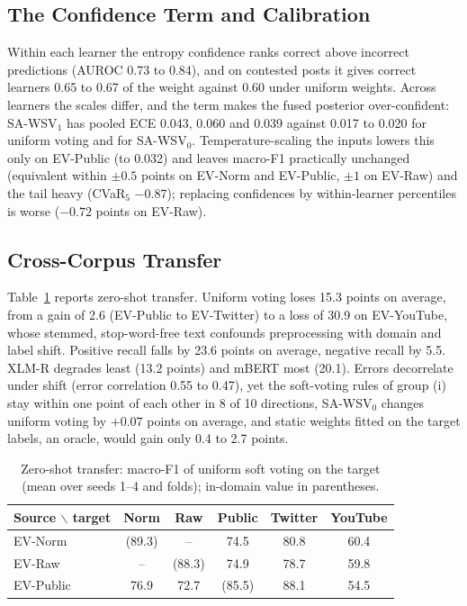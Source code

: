 \documentclass[conference,a4paper]{IEEEtran}
\newcommand{\rcz}{SA\mbox{-}WSV$_0$}
\newcommand{\rco}{SA\mbox{-}WSV$_1$}
\begin{document}
\subsection{The Confidence Term and Calibration}
Within each learner the entropy confidence ranks correct above incorrect predictions (AUROC 0.73 to 0.84), and on contested posts it gives correct learners 0.65 to 0.67 of the weight against 0.60 under uniform weights. Across learners the scales differ, and the term makes the fused posterior over-confident: \rco{} has pooled ECE 0.043, 0.060 and 0.039 against 0.017 to 0.020 for uniform voting and for \rcz. Temperature-scaling the inputs lowers this only on EV-Public (to 0.032) and leaves macro-F1 practically unchanged (equivalent within $\pm0.5$ points on EV-Norm and EV-Public, $\pm1$ on EV-Raw) and the tail heavy (CVaR$_5$ $-0.87$); replacing confidences by within-learner percentiles is worse ($-0.72$ points on EV-Raw).

\subsection{Cross-Corpus Transfer}
Table~\ref{tab:transfer} reports zero-shot transfer. Uniform voting loses 15.3 points on average, from a gain of 2.6 (EV-Public to EV-Twitter) to a loss of 30.9 on EV-YouTube, whose stemmed, stop-word-free text confounds preprocessing with domain and label shift. Positive recall falls by 23.6 points on average, negative recall by 5.5. XLM-R degrades least (13.2 points) and mBERT most (20.1). Errors decorrelate under shift (error correlation 0.55 to 0.47), yet the soft-voting rules of group (i) stay within one point of each other in 8 of 10 directions, \rcz{} changes uniform voting by $+0.07$ points on average, and static weights fitted on the target labels, an oracle, would gain only 0.4 to 2.7 points.

\begin{table}[t]
\caption{Zero-shot transfer: macro-F1 of uniform soft voting on the target (mean over seeds 1--4 and folds); in-domain value in parentheses.}
\label{tab:transfer}
\centering
\footnotesize
\setlength{\tabcolsep}{3pt}
\begin{tabular}{lccccc}
\toprule
Source $\backslash$ target & Norm & Raw & Public & Twitter & YouTube \\
\midrule
EV-Norm   & (89.3) & -- & 74.5 & 80.8 & 60.4 \\
EV-Raw    & -- & (88.3) & 74.9 & 78.7 & 59.8 \\
EV-Public & 76.9 & 72.7 & (85.5) & 88.1 & 54.5 \\
\bottomrule
\end{tabular}
\end{table}
\end{document}
